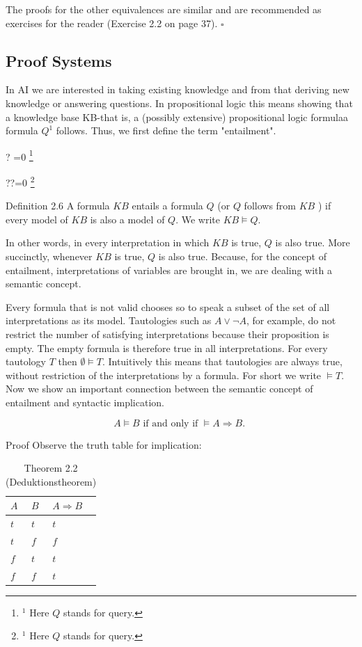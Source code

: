 \documentclass[10pt]{book}
\let\svthefootnote\thefootnote
\newcommand\blfootnotetext[1]{%
  \let\thefootnote\relax\footnote{#1}%
  \addtocounter{footnote}{-1}%
  \let\thefootnote\svthefootnote%
}
\let\svfootnotetext\footnotetext
\renewcommand\footnotetext[2][?]{%
  \if\relax#1\relax%
    \ifnum\value{footnote}=0\blfootnotetext{#2}\else\svfootnotetext{#2}\fi%
  \else%
    \if?#1\ifnum\value{footnote}=0\blfootnotetext{#2}\else\svfootnotetext{#2}\fi%
    \else\svfootnotetext[#1]{#2}\fi%
  \fi
}
\begin{document}
The proofs for the other equivalences are similar and are recommended as exercises for the reader (Exercise 2.2 on page 37). \(\square\)

\subsection*{Proof Systems}
In AI we are interested in taking existing knowledge and from that deriving new knowledge or answering questions. In propositional logic this means showing that a knowledge base KB-that is, a (possibly extensive) propositional logic formulaa formula $Q^{1}$ follows. Thus, we first define the term "entailment".

Definition 2.6 A formula $K B$ entails a formula $Q$ (or $Q$ follows from $K B$ ) if every model of $K B$ is also a model of $Q$. We write $K B \models Q$.

In other words, in every interpretation in which $K B$ is true, $Q$ is also true. More succinctly, whenever $K B$ is true, $Q$ is also true. Because, for the concept of entailment, interpretations of variables are brought in, we are dealing with a semantic concept.

Every formula that is not valid chooses so to speak a subset of the set of all interpretations as its model. Tautologies such as $A \vee \neg A$, for example, do not restrict the number of satisfying interpretations because their proposition is empty. The empty formula is therefore true in all interpretations. For every tautology $T$ then $\emptyset \models T$. Intuitively this means that tautologies are always true, without restriction of the interpretations by a formula. For short we write $\models T$. Now we show an important connection between the semantic concept of entailment and syntactic implication.

$$
A \models B \text { if and only if } \models A \Rightarrow B \text {. }
$$

Proof Observe the truth table for implication:

\begin{table}[htbp]
\begin{center}
\captionsetup{labelformat=empty}
\caption{Theorem 2.2 (Deduktionstheorem)}
\begin{tabular}{lll}
$A$ & $B$ & $A \Rightarrow B$ \\
\hline
$t$ & $t$ & $t$ \\
\hline
$t$ & $f$ & $f$ \\
\hline
$f$ & $t$ & $t$ \\
\hline
$f$ & $f$ & $t$ \\
\hline
\end{tabular}
\end{center}
\end{table}
\end{document}
